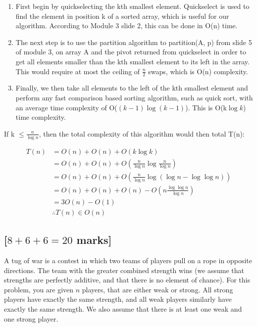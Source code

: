 \documentclass[12pt]{article}
\begin{document}
\begin{enumerate}
  \item First begin by quickselecting the kth smallest element. Quickselect is used to find the element in position k of a sorted array, which is useful for our algorithm. According to Module 3 slide 2, this can be done in O(n) time.
  \item The next step is to use the partition algorithm to partition(A, p) from slide 5 of module 3, on array A and the pivot returned from quickselect in order to get all elements smaller than the kth smallest element to its left in the array. This would require at most the ceiling of $\frac{n}{2}$ swaps, which is O(n) complexity.
  \item Finally, we then take all elements to the left of the kth smallest element and perform any fast comparison based sorting algorithm, such as quick sort, with an average time complexity of O($(k-1)\log (k-1)$). This is O(k$\log k$) time complexity.
\end{enumerate}

If k $\leq \frac{n}{\log n}$, then the total complexity of this algorithm would then total T(n):

\begin{align*}
  T(n)&= O(n) + O(n) + O(k\log k)\\
  &= O(n) + O(n) + O(\frac{n}{\log n}\log \frac{n}{\log n})\\
  &= O(n) + O(n) + O(\frac{n}{\log n}\log (\log n - \log \log n))\\
  &= O(n) + O(n) + O(n) - O(n\frac{\log \log n}{\log n})\\
  &= 3O(n) - O(1)\\
  &\therefore T(n) \in O(n)
\end{align*}

\subsection{[$8 + 6 + 6 = 20$ marks]}

A tug of war is a contest in which two teams of players pull on a rope in
opposite directions. The team with the greater combined strength wins (we
assume that strengths are perfectly additive, and that there is no element of
chance). For this problem, you are given $n$ players, that are either weak or
strong. All strong players have exactly the same strength, and all weak
players similarly have exactly the same strength. We also assume that there is
at least one weak and one strong player.
\end{document}
